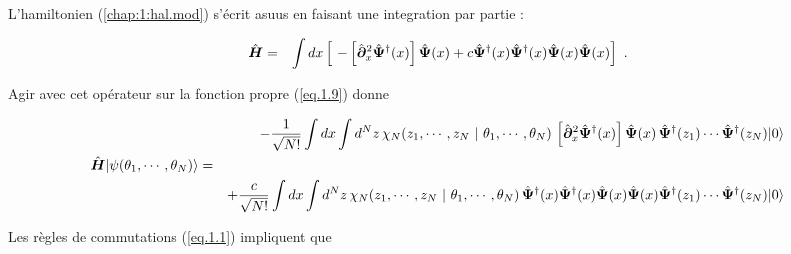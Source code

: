L'hamiltonien (\ref{chap:1:hal.mod}) s'écrit asuus en faisant  une integration par partie :


\begin{eqnarray}
	\operator{H} & = & \int dx \left [ -\left [\operator{\partial}_x^2 \operator{\Psi}^\dag(x)\right ] \operator{\Psi}(x) + c \operator{\Psi}^\dag (x) \operator{\Psi}^\dag (x) \operator{\Psi} (x) \operator{\Psi} (x) \right ] \label{chap:1:hal.mod.2}.
\end{eqnarray}

Agir avec cet opérateur sur la fonction propre (\ref{eq.1.9}) donne 

\begin{eqnarray}
	& & - \frac{1}{ \sqrt{N!}} \int dx \int d^N z \, \chi_N ( z_1 , \cdots , z_N  ~\vert ~ \theta_1 , \cdots , \theta _N ) \,	\left [\hat{\bm{\partial}}_x^2 \hat{\bm{\Psi}}^\dag(x)\right ] \hat{\bm{\Psi}}(x)\,  \hat{\bm{\Psi}}^\dag(z_1) \cdots \hat{\bm{\Psi}}^\dag(z_N) \vert 0 \rangle \label{chap:1:hal.mod.3.1}\\
	\hat{\bm{H}}\vert \psi ( \theta_1 , \cdots , \theta_N ) \rangle & = & \nonumber \\
	& & +\frac{c}{ \sqrt{N!}} \int dx \int d^N z \, \chi_N ( z_1 , \cdots , z_N  ~\vert ~ \theta_1 , \cdots , \theta _N ) 	\, \hat{\bm{\Psi}}^\dag(x)\hat{\bm{\Psi}}^\dag(x) \hat{\bm{\Psi}}(x)\hat{\bm{\Psi}}(x)  \hat{\bm{\Psi}}^\dag(z_1) \cdots \hat{\bm{\Psi}}^\dag(z_N) \vert 0 \rangle \label{chap:1:hal.mod.3.1} 
\end{eqnarray}

Les règles de commutations (\ref{eq.1.1}) impliquent que 

